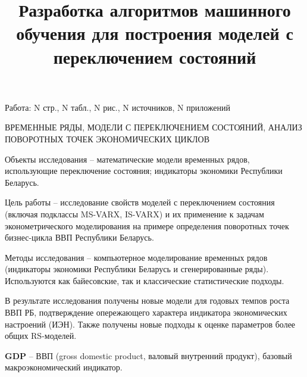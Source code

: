\documentclass[a4paper,14pt]{extreport}
\title{Разработка алгоритмов машинного обучения для построения моделей с переключением состояний}
\author{\@authorlast \@authorfirst}
\begin{document}
\maketitle




Работа: N стр., N табл., N рис., N источников, N приложений

\MakeUppercase{временные ряды, модели с переключением состояний, анализ поворотных точек экономических циклов}

Объекты исследования -- математические модели временных рядов, использующие переключение состояния; индикаторы экономики Республики Беларусь.

Цель работы -- исследование свойств моделей с переключением состояния (включая подклассы MS-VARX, IS-VARX) и их применение к задачам эконометрического моделирования на примере определения поворотных точек бизнес-цикла ВВП Республики Беларусь.

Методы исследования -- компьютерное моделирование временных рядов (индикаторы экономики Республики Беларусь и сгенерированные ряды). Используются как байесовские, так и классические статистические подходы.

В результате исследования получены новые модели для годовых темпов роста ВВП РБ, подтверждение опережающего характера индикатора экономических настроений (ИЭН). Также получены новые подходы к оценке параметров более общих RS-моделей.



\clearpage
\renewcommand{\contentsname}{Содержание}
\tableofcontents





\textbf{GDP} -- ВВП (gross domestic product, валовый внутренний продукт), базовый макроэкономический индикатор.
\end{document}
